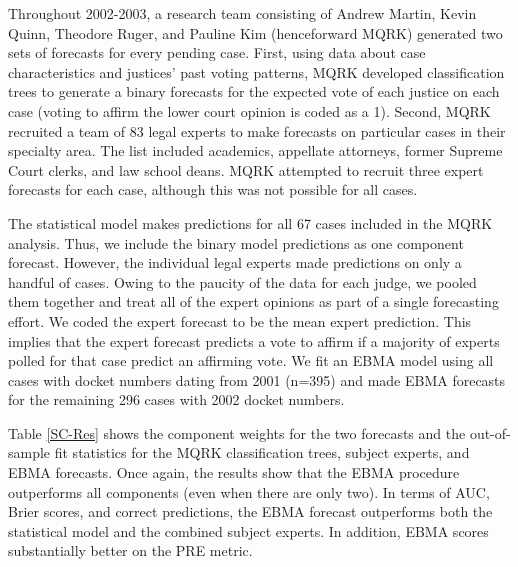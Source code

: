 Throughout 2002-2003, a research team consisting of Andrew
Martin, Kevin Quinn, Theodore Ruger, and Pauline Kim (henceforward
MQRK) generated two sets of forecasts for every pending case.  First,
using data about case characteristics and justices' past voting
patterns, MQRK developed classification trees to generate a binary
forecasts for the expected vote of each justice on each case (voting
to affirm the lower court opinion is coded as a 1).  Second, MQRK
recruited a team of 83 legal experts to make forecasts on particular
cases in their specialty area.  The list included academics, appellate
attorneys, former Supreme Court clerks, and law school deans.  MQRK
attempted to recruit three expert forecasts for each case, although
this was not possible for all cases.

The statistical model makes predictions for all 67 cases included in
the MQRK analysis.  Thus, we include the binary model predictions as
one component forecast. However, the individual legal experts made
predictions on only a handful of cases. Owing to the paucity of the
data for each judge, we pooled them together and treat all of the
expert opinions as part of a single forecasting effort.  We coded the
expert forecast to be the mean expert prediction. This implies that
the expert forecast predicts a vote to affirm if a majority of experts
polled for that case predict an affirming vote.  We fit an EBMA model
using all cases with docket numbers dating from 2001 (n=395) and made EBMA forecasts for
the remaining 296 cases with 2002 docket numbers.


Table \ref{SC-Res} shows the component weights for the two forecasts
and the out-of-sample fit statistics for the MQRK classification
trees, subject experts, and EBMA forecasts. Once again, the results
show that the EBMA procedure outperforms all components (even when
there are only two).  In terms of AUC, Brier scores, and correct
predictions, the EBMA forecast outperforms both the statistical model
and the combined subject experts.  In addition, EBMA scores
substantially better on the PRE metric.

